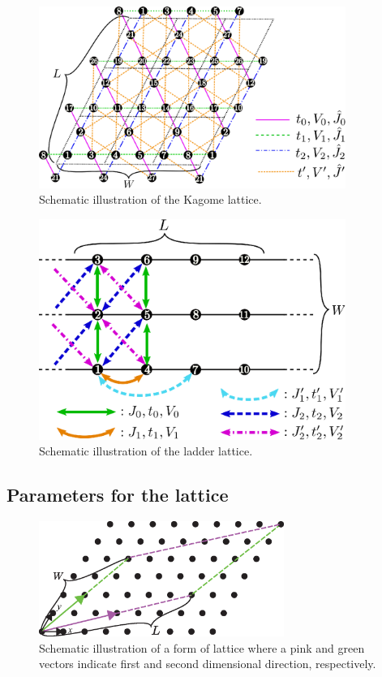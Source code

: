 \begin{itemize}
\begin{figure}[!htbp]
  \begin{center}
    \includegraphics[width=10cm]{../figs/kagome.eps}
    \caption{Schematic illustration of the Kagome lattice.
    }
    \label{fig_kagome}
  \end{center}
\end{figure}

\begin{figure}[!htbp]
  \begin{center}
    \includegraphics[width=10cm]{../figs/ladder.eps}
    \caption{Schematic illustration of the ladder lattice.
    }
    \label{fig_ladder}
  \end{center}
\end{figure}


\end{itemize}

\subsection{Parameters for the lattice}


\begin{figure}[!htbp]
  \begin{center}
    \includegraphics[width=8cm]{../figs/chap04_1_unitlattice.eps}
    \caption{Schematic illustration of a form of lattice where a pink and green vectors indicate first and second dimensional direction, respectively. 
    }
    \label{fig_chap04_1_unitlattice}
  \end{center}
\end{figure}

